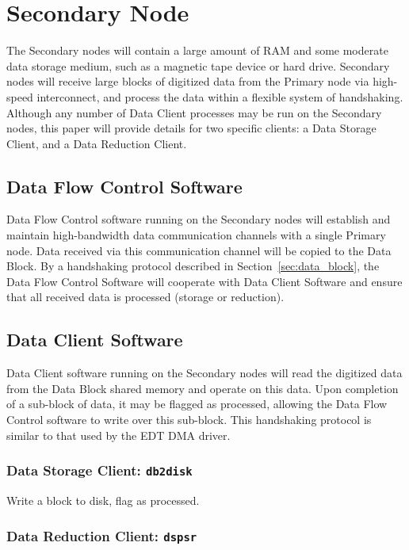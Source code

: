 \chapter{Secondary Node}

The Secondary nodes will contain a large amount of RAM and some
moderate data storage medium, such as a magnetic tape device or hard
drive.  Secondary nodes will receive large blocks of digitized data
from the Primary node via high-speed interconnect, and process the
data within a flexible system of handshaking.  Although any number of
Data Client processes may be run on the Secondary nodes, this paper
will provide details for two specific clients: a Data Storage Client,
and a Data Reduction Client.

\section{Data Flow Control Software}

Data Flow Control software running on the Secondary nodes will
establish and maintain high-bandwidth data communication channels with
a single Primary node.  Data received via this communication channel
will be copied to the Data Block.  By a handshaking protocol described
in Section~\ref{sec:data_block}, the Data Flow Control Software will
cooperate with Data Client Software and ensure that all received data
is processed (storage or reduction).

\section{Data Client Software}

Data Client software running on the Secondary nodes will read the
digitized data from the Data Block shared memory and operate on this
data.  Upon completion of a sub-block of data, it may be flagged as
processed, allowing the Data Flow Control software to write over this
sub-block.  This handshaking protocol is similar to that used by the
EDT DMA driver.

\subsection{Data Storage Client: {\tt db2disk}}

Write a block to disk, flag as processed.

\subsection{Data Reduction Client: {\tt dspsr}}

